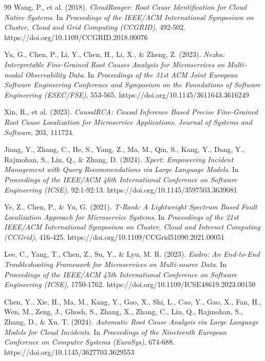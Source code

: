\documentclass[conference]{IEEEtran}
\begin{document}
\begin{thebibliography}{99}
Wang, P., et al. (2018).
\textit{CloudRanger: Root Cause Identification for Cloud Native Systems}.
In \textit{Proceedings of the IEEE/ACM International Symposium on Cluster, Cloud and Grid Computing (CCGRID)}, 492-502.
https://doi.org/10.1109/CCGRID.2018.00076

Yu, G., Chen, P., Li, Y., Chen, H., Li, X., \& Zheng, Z. (2023).
\textit{Nezha: Interpretable Fine-Grained Root Causes Analysis for Microservices on Multi-modal Observability Data}.
In \textit{Proceedings of the 31st ACM Joint European Software Engineering Conference and Symposium on the Foundations of Software Engineering (ESEC/FSE)}, 553-565.
https://doi.org/10.1145/3611643.3616249

Xin, R., et al. (2023).
\textit{CausalRCA: Causal Inference Based Precise Fine-Grained Root Cause Localization for Microservice Applications}.
\textit{Journal of Systems and Software}, 203, 111724.

Jiang, Y., Zhang, C., He, S., Yang, Z., Ma, M., Qin, S., Kang, Y., Dang, Y., Rajmohan, S., Lin, Q., \& Zhang, D. (2024).
\textit{Xpert: Empowering Incident Management with Query Recommendations via Large Language Models}.
In \textit{Proceedings of the IEEE/ACM 46th International Conference on Software Engineering (ICSE)}, 92:1-92:13.
https://doi.org/10.1145/3597503.3639081

Ye, Z., Chen, P., \& Yu, G. (2021).
\textit{T-Rank: A Lightweight Spectrum Based Fault Localization Approach for Microservice Systems}.
In \textit{Proceedings of the 21st IEEE/ACM International Symposium on Cluster, Cloud and Internet Computing (CCGrid)}, 416-425.
https://doi.org/10.1109/CCGrid51090.2021.00051

Lee, C., Yang, T., Chen, Z., Su, Y., \& Lyu, M. R. (2023).
\textit{Eadro: An End-to-End Troubleshooting Framework for Microservices on Multi-source Data}.
In \textit{Proceedings of the IEEE/ACM 45th International Conference on Software Engineering (ICSE)}, 1750-1762.
https://doi.org/10.1109/ICSE48619.2023.00150

Chen, Y., Xie, H., Ma, M., Kang, Y., Gao, X., Shi, L., Cao, Y., Gao, X., Fan, H., Wen, M., Zeng, J., Ghosh, S., Zhang, X., Zhang, C., Lin, Q., Rajmohan, S., Zhang, D., \& Xu, T. (2024).
\textit{Automatic Root Cause Analysis via Large Language Models for Cloud Incidents}.
In \textit{Proceedings of the Nineteenth European Conference on Computer Systems (EuroSys)}, 674-688.
https://doi.org/10.1145/3627703.3629553

\end{thebibliography}
\end{document}
